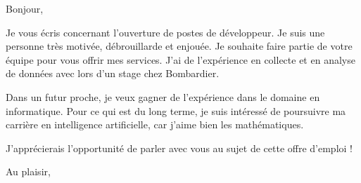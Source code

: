 \documentclass[12pt,french]{letter}
\begin{document}
\pagestyle{headings}

\begin{letter}{}
\address{Montréal, Canada}

\opening{Bonjour,}


Je vous écris concernant l'ouverture de postes de développeur.
Je suis une personne très motivée, débrouillarde et enjouée. Je souhaite faire partie de votre équipe pour vous offrir mes services. 
J'ai de l'expérience en collecte et en analyse de données avec lors d'un stage chez Bombardier. 

Dans un futur proche, je veux gagner de l'expérience dans le domaine en informatique. Pour ce qui est du long terme, je suis intéressé de poursuivre ma carrière en intelligence artificielle, car j'aime bien les mathématiques.

J'apprécierais l'opportunité de parler avec vous au sujet de cette offre d'emploi !
\signature{Maxime}

\closing{Au plaisir,}


\end{letter}
\end{document}
